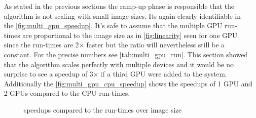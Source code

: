As stated in the previous sections the ramp-up phase is responsible that the
algorithm is not scaling with small image sizes. Its again clearly identifiable
in the \autoref{fig:multi_gpu_speedup}. It's safe to assume that the multiple
\gls{GPU} run-times are proportional to the image size as in
\autoref{fig:linearity} seen for one \gls{GPU} since the run-times are 2$\times$
faster but the ratio will nevertheless still be a constant. For the precise
numbers see \autoref{tab:multi_gpu_run}. This section showed that the algorithm
scales perfectly with multiple devices and it would be no surprise to see a
speedup of 3$\times$ if a third \gls{GPU} were added to the system. Additionally
the \autoref{fig:multi_gpu_cpu_speedup} shows the speedups of 1 \gls{GPU} and 2
\glspl{GPU} compared to the \gls{CPU} run-times.

\begin{figure}[ht]
  \centering
	

	\tableA
	\tableB	

	\caption{{} speedups compared to the {} 
					 run-times over image size}%
	\label{fig:multi_gpu_cpu_speedup}
\end{figure}


